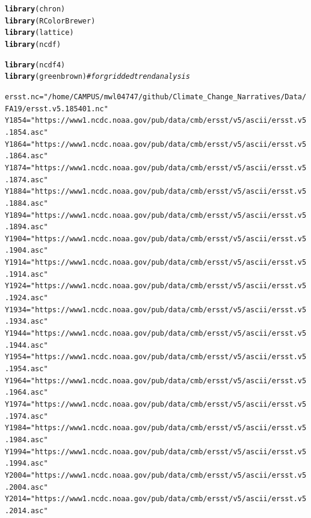 \documentclass{article}\usepackage[]{graphicx}\usepackage[]{color}
\makeatletter
\newcommand{\hlstr}[1]{\textcolor[rgb]{0.192,0.494,0.8}{#1}}%
\newcommand{\hlcom}[1]{\textcolor[rgb]{0.678,0.584,0.686}{\textit{#1}}}%
\newcommand{\hlstd}[1]{\textcolor[rgb]{0.345,0.345,0.345}{#1}}%
\newcommand{\hlkwb}[1]{\textcolor[rgb]{0.69,0.353,0.396}{#1}}%
\newcommand{\hlkwd}[1]{\textcolor[rgb]{0.737,0.353,0.396}{\textbf{#1}}}%
\newenvironment{kframe}{%
 \def\at@end@of@kframe{}%
 \ifinner\ifhmode%
  \def\at@end@of@kframe{\end{minipage}}%
  \begin{minipage}{\columnwidth}%
 \fi\fi%
 \def\FrameCommand##1{\hskip\@totalleftmargin \hskip-\fboxsep
 \colorbox{shadecolor}{##1}\hskip-\fboxsep
     \hskip-\linewidth \hskip-\@totalleftmargin \hskip\columnwidth}%
 \MakeFramed {\advance\hsize-\width
   \@totalleftmargin\z@ \linewidth\hsize
   \@setminipage}}%
 {\par\unskip\endMakeFramed%
 \at@end@of@kframe}
\newenvironment{knitrout}{}{} %
\makeatother
\begin{document}
\begin{knitrout}
\color{fgcolor}\begin{kframe}
\begin{alltt}
\hlkwd{library}\hlstd{(chron)}
\hlkwd{library}\hlstd{(RColorBrewer)}
\hlkwd{library}\hlstd{(lattice)}
\hlkwd{library}\hlstd{(ncdf)}
\end{alltt}


{\ttfamily\noindent\bfseries\color{errorcolor}{\#\# Error in library(ncdf): there is no package called 'ncdf'}}\begin{alltt}
\hlkwd{library}\hlstd{(ncdf4)}
\hlkwd{library}\hlstd{(greenbrown)} \hlcom{# for gridded trend analysis}
\end{alltt}


{\ttfamily\noindent\bfseries\color{errorcolor}{\#\# Error in library(greenbrown): there is no package called 'greenbrown'}}\begin{alltt}
\hlstd{ersst.nc} \hlkwb{=} \hlstr{"/home/CAMPUS/mwl04747/github/Climate_Change_Narratives/Data/FA19/ersst.v5.185401.nc"}
\hlstd{Y1854} \hlkwb{=} \hlstr{"https://www1.ncdc.noaa.gov/pub/data/cmb/ersst/v5/ascii/ersst.v5.1854.asc"}
\hlstd{Y1864} \hlkwb{=} \hlstr{"https://www1.ncdc.noaa.gov/pub/data/cmb/ersst/v5/ascii/ersst.v5.1864.asc"}
\hlstd{Y1874} \hlkwb{=} \hlstr{"https://www1.ncdc.noaa.gov/pub/data/cmb/ersst/v5/ascii/ersst.v5.1874.asc"}
\hlstd{Y1884} \hlkwb{=} \hlstr{"https://www1.ncdc.noaa.gov/pub/data/cmb/ersst/v5/ascii/ersst.v5.1884.asc"}
\hlstd{Y1894} \hlkwb{=} \hlstr{"https://www1.ncdc.noaa.gov/pub/data/cmb/ersst/v5/ascii/ersst.v5.1894.asc"}
\hlstd{Y1904} \hlkwb{=} \hlstr{"https://www1.ncdc.noaa.gov/pub/data/cmb/ersst/v5/ascii/ersst.v5.1904.asc"}
\hlstd{Y1914} \hlkwb{=} \hlstr{"https://www1.ncdc.noaa.gov/pub/data/cmb/ersst/v5/ascii/ersst.v5.1914.asc"}
\hlstd{Y1924} \hlkwb{=} \hlstr{"https://www1.ncdc.noaa.gov/pub/data/cmb/ersst/v5/ascii/ersst.v5.1924.asc"}
\hlstd{Y1934} \hlkwb{=} \hlstr{"https://www1.ncdc.noaa.gov/pub/data/cmb/ersst/v5/ascii/ersst.v5.1934.asc"}
\hlstd{Y1944} \hlkwb{=} \hlstr{"https://www1.ncdc.noaa.gov/pub/data/cmb/ersst/v5/ascii/ersst.v5.1944.asc"}
\hlstd{Y1954} \hlkwb{=} \hlstr{"https://www1.ncdc.noaa.gov/pub/data/cmb/ersst/v5/ascii/ersst.v5.1954.asc"}
\hlstd{Y1964} \hlkwb{=} \hlstr{"https://www1.ncdc.noaa.gov/pub/data/cmb/ersst/v5/ascii/ersst.v5.1964.asc"}
\hlstd{Y1974} \hlkwb{=} \hlstr{"https://www1.ncdc.noaa.gov/pub/data/cmb/ersst/v5/ascii/ersst.v5.1974.asc"}
\hlstd{Y1984} \hlkwb{=} \hlstr{"https://www1.ncdc.noaa.gov/pub/data/cmb/ersst/v5/ascii/ersst.v5.1984.asc"}
\hlstd{Y1994} \hlkwb{=} \hlstr{"https://www1.ncdc.noaa.gov/pub/data/cmb/ersst/v5/ascii/ersst.v5.1994.asc"}
\hlstd{Y2004} \hlkwb{=} \hlstr{"https://www1.ncdc.noaa.gov/pub/data/cmb/ersst/v5/ascii/ersst.v5.2004.asc"}
\hlstd{Y2014} \hlkwb{=} \hlstr{"https://www1.ncdc.noaa.gov/pub/data/cmb/ersst/v5/ascii/ersst.v5.2014.asc"}


\end{alltt}
\end{kframe}
\end{knitrout}
\end{document}
